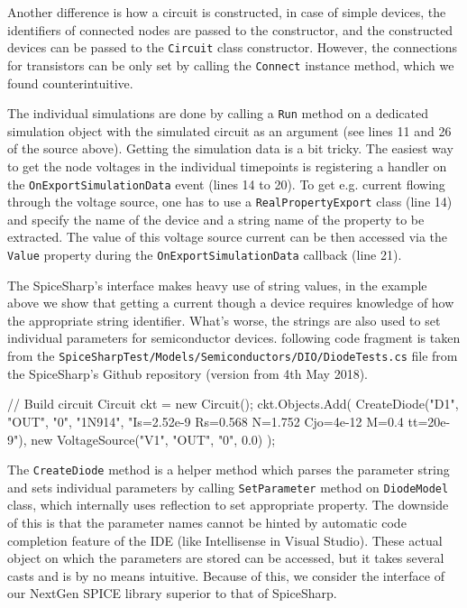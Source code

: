 Another difference is how a circuit is constructed, in case of simple devices, the identifiers of connected nodes are passed to the constructor, and the constructed devices can be passed to the \texttt{Circuit} class constructor. However, the connections for transistors can be only set by calling the \texttt{Connect} instance method, which we found counterintuitive. 

The individual simulations are done by calling a \texttt{Run} method on a dedicated simulation object with the simulated circuit as an argument (see lines 11 and 26 of the source above). Getting the simulation data is a bit tricky. The easiest way to get the node voltages in the individual timepoints is registering a handler on the \texttt{OnExportSimulationData} event (lines 14 to 20). To get e.g. current flowing through the voltage source, one has to use a \texttt{RealPropertyExport} class (line 14) and specify the name of the device and a string name of the property to be extracted. The value of this voltage source current can be then accessed via the \texttt{Value} property during the \texttt{OnExportSimulationData} callback (line 21). 

The SpiceSharp's interface makes heavy use of string values, in the example above we show that getting a current though a device requires knowledge of how the appropriate string identifier. What's worse, the strings are also used to set individual parameters for semiconductor devices. following code fragment is taken from the \texttt{SpiceSharpTest/Models/Semiconductors/DIO/DiodeTests.cs} file from the SpiceSharp's Github repository (version from 4th May 2018).

\begin{csharpcode}
     // Build circuit
	Circuit ckt = new Circuit();
	ckt.Objects.Add(
		CreateDiode("D1", "OUT", "0", "1N914", 
			"Is=2.52e-9 Rs=0.568 N=1.752 Cjo=4e-12 M=0.4 tt=20e-9"),
		new VoltageSource("V1", "OUT", "0", 0.0)
	);
\end{csharpcode}

The \texttt{CreateDiode} method is a helper method which parses the parameter string and sets individual parameters by calling \texttt{SetParameter} method on \texttt{Diode\+Model} class, which internally uses reflection to set appropriate property. The downside of this is that the parameter names cannot be hinted by automatic code completion feature of the IDE (like Intellisense in Visual Studio). These actual object on which the parameters are stored can be accessed, but it takes several casts and is by no means intuitive. Because of this, we consider the interface of our NextGen SPICE library superior to that of SpiceSharp.

